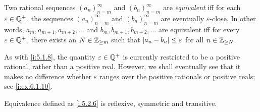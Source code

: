 \setcounter{thm}{5}
\begin{defn}\label{i:5.2.6}
  Two rational sequences \((a_n)_{n = m}^{\infty}\) and \((b_n)_{n = m}^{\infty}\) are \emph{equivalent} iff for each \(\varepsilon \in \mathbb{Q}^+\), the sequences \((a_n)_{n = m}^{\infty}\) and \((b_n)_{n = m}^{\infty}\) are eventually \(\varepsilon\)-close.
  In other words, \(a_m, a_{m + 1}, a_{m + 2}, \dots\) and \(b_m, b_{m + 1}, b_{m + 2}, \dots\) are equivalent iff for every \(\varepsilon \in \mathbb{Q}^+\), there exists an \(N \in \mathbb{Z}_{\geq m}\) such that \(\left\lvert a_n - b_n\right\rvert \leq \varepsilon\) for all \(n \in \mathbb{Z}_{\geq N}\).
\end{defn}

\begin{rmk}\label{i:5.2.7}
  As with \cref{i:5.1.8}, the quantity \(\varepsilon \in \mathbb{Q}^+\) is currently restricted to be a positive rational, rather than a positive real.
  However, we shall eventually see that it makes no difference whether \(\varepsilon\) ranges over the positive rationals or positive reals;
  see \cref{i:ex:6.1.10}.
\end{rmk}

\begin{ac}\label{i:ac:5.2.1}
  Equivalence defined as \cref{i:5.2.6} is reflexive, symmetric and transitive.
\end{ac}

